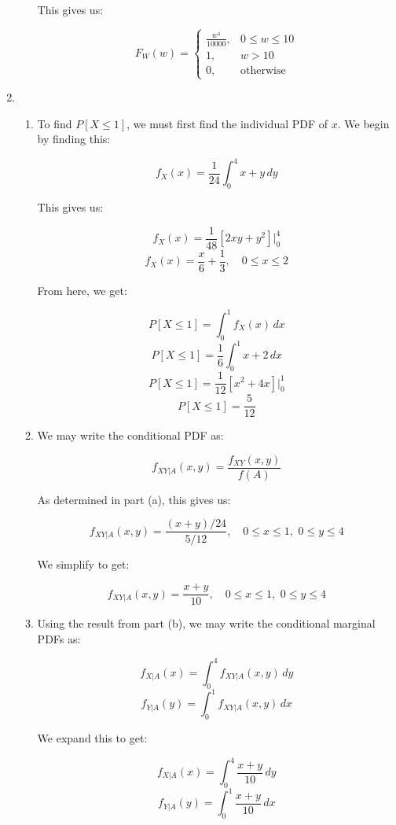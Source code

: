 \begin{enumerate}
\begin{enumerate}
        This gives us:

        $$\boxed{F_W(w)=\left\{\begin{array}{ll} \frac{w^4}{10000}, & 0\leq w\leq 10\\ 1, & w>10\\0, & \text{otherwise}\end{array}}$$

    \end{enumerate}

    \setcounter{enumi}{3}

  \item

    \begin{enumerate}

      \item To find $P[X\leq 1]$, we must first find the individual PDF of $x$. We begin by finding this:

        $$f_X(x)=\frac{1}{24}\int_0^4 x+y\,dy$$

        This gives us:

        $$f_X(x)=\frac{1}{48}\left[2xy+y^2\right]\Big|_0^4$$
        $$f_X(x)=\frac{x}{6}+\frac{1}{3},\quad 0\leq x\leq 2$$

        From here, we get:

        $$P[X\leq 1]=\int_0^1 f_X(x)\,dx$$
        $$P[X\leq 1]=\frac{1}{6}\int_0^1 x+2\,dx$$
        $$P[X\leq 1]=\frac{1}{12}\left[x^2+4x\right]\Big|_0^1$$
        $$\boxed{P[X\leq 1]=\frac{5}{12}}$$

      \item We may write the conditional PDF as:

        $$f_{XY|A}(x,y)=\frac{f_{XY}(x,y)}{f(A)}$$

        As determined in part (a), this gives us:

        $$f_{XY|A}(x,y)=\frac{(x+y)/24}{5/12},\quad 0\leq x\leq 1,\,\, 0\leq y\leq4$$

        We simplify to get:

        $$\boxed{f_{XY|A}(x,y)=\frac{x+y}{10},\quad 0\leq x\leq 1,\,\, 0\leq y\leq4}$$

      \item Using the result from part (b), we may write the conditional marginal PDFs as:

        $$f_{X|A}(x)=\int_0^4 f_{XY|A}(x,y)\,dy$$
        $$f_{Y|A}(y)=\int_0^1 f_{XY|A}(x,y)\,dx$$

        We expand this to get:

        $$f_{X|A}(x)=\int_0^4 \frac{x+y}{10}\,dy$$
        $$f_{Y|A}(y)=\int_0^1 \frac{x+y}{10}\,dx$$


\end{enumerate}
\end{enumerate}
